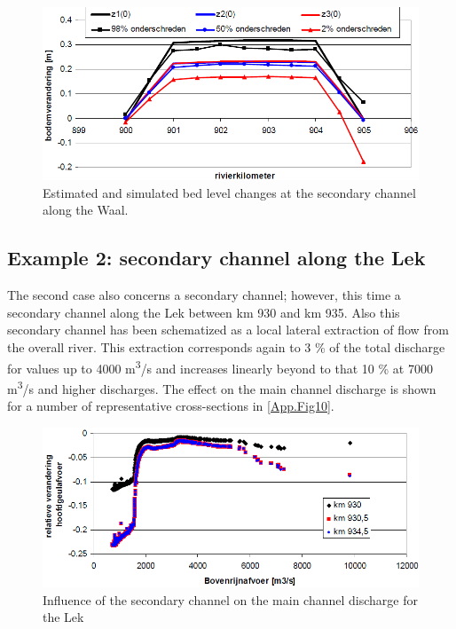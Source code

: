 \begin{figure}
\includegraphics[width=\columnwidth]{figures/Fig9.png}
\caption{Estimated and simulated bed level changes at the secondary channel along the Waal.}
\label{App.Fig9}
\end{figure}

\subsection{Example 2: secondary channel along the Lek}

The second case also concerns a secondary channel; however, this time a secondary channel along the Lek between km 930 and km 935.
Also this secondary channel has been schematized as a local lateral extraction of flow from the overall river.
This extraction corresponds again to 3 \% of the total discharge for values up to 4000 m\textsuperscript{3}/s and increases linearly beyond to that 10 \% at 7000 m\textsuperscript{3}/s and higher discharges.
The effect on the main channel discharge is shown for a number of representative cross-sections in \autoref{App.Fig10}.

\begin{figure}
\includegraphics[width=\columnwidth]{figures/Fig10.png}
\caption{Influence of the secondary channel on the main channel discharge for the Lek}
\label{App.Fig10}
\end{figure}

